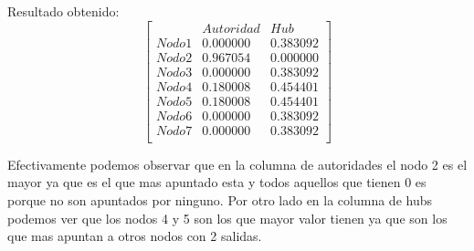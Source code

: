 Resultado obtenido:
   $$ 
\begin{bmatrix}
              &    Autoridad  &  Hub \\
 Nodo 1 &   0.000000    &      0.383092       \\
 Nodo 2   &  0.967054    &  0.000000     \\
 Nodo 3   &  0.000000   &     0.383092  \\
 Nodo 4   &  0.180008    &     0.454401       \\
 Nodo 5   &  0.180008    &     0.454401        \\
 Nodo 6   &  0.000000    &      0.383092     \\
 Nodo 7   &  0.000000   &     0.383092 \\
\end{bmatrix} 
$$

Efectivamente podemos observar que en la columna de autoridades el nodo 2 es el mayor ya que es el que mas apuntado esta y todos aquellos que tienen 0 es porque no son apuntados por ninguno. Por otro lado en la columna de hubs podemos ver que los nodos 4 y 5 son los que mayor valor tienen ya que son los que mas apuntan a otros nodos con 2 salidas.
